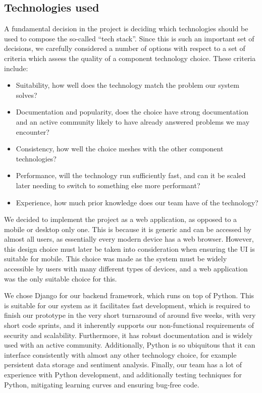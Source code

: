 \documentclass[10pt]{article}
\begin{document}
\subsection{Technologies used}
A fundamental decision in the project is deciding which technologies should be
used to compose the so-called “tech stack”. Since this is such an important set
of decisions, we carefully considered a number of options with respect to a set
of criteria which assess the quality of a component technology choice. These
criteria include:\\ 
\begin{itemize}
    \item Suitability, how well does the technology match the problem
our system solves? 
    \item Documentation and popularity, does the choice have strong
documentation and an active community likely to have already answered problems
we may encounter? 
    \item Consistency, how well the choice meshes with the other
component technologies? 
    \item Performance, will the technology run sufficiently fast,
and can it be scaled later needing to switch to something else more performant?
    \item Experience, how much prior knowledge does our team have of the technology? 
\end{itemize}

We decided to implement the project as a web application, as opposed to a mobile or
desktop only one. This is because it is generic and can be accessed by almost
all users, as essentially every modern device has a web browser. However, this
design choice must later be taken into consideration when ensuring the UI is
suitable for mobile. This choice was made as the system must be widely
accessible by users with many different types of devices, and a web application
was the only suitable choice for this.

We chose Django for our backend framework, which runs on top of Python. This is
suitable for our system as it facilitates fast development, which is required to
finish our prototype in the very short turnaround of around five weeks, with
very short code sprints, and it inherently supports our non-functional
requirements of security and scalability. Furthermore, it has robust
documentation and is widely used with an active community. Additionally, Python
is so ubiquitous that it can interface consistently with almost any other
technology choice, for example persistent data storage and sentiment analysis.
Finally, our team has a lot of experience with Python development, and
additionally testing techniques for Python, mitigating learning curves and
ensuring bug-free code.
\end{document}
